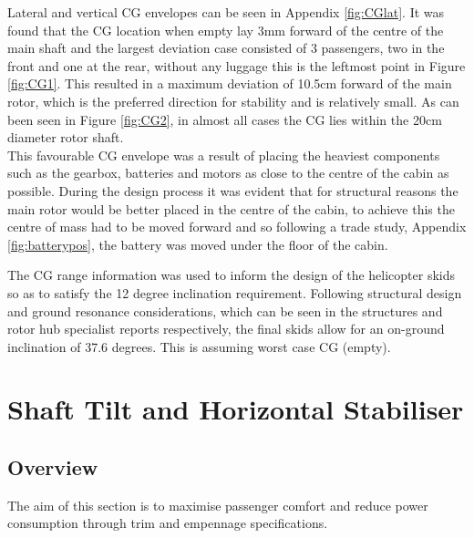 \documentclass[11pt,a4paper]{article}
\begin{document}
Lateral and vertical CG envelopes can be seen in Appendix \ref{fig:CGlat}.
It was found that the CG location when empty lay 3mm forward of the centre of the main shaft and the largest deviation case consisted of 3 passengers, two in the front and one at the rear, without any luggage this is the leftmost point in Figure \ref{fig:CG1}. This resulted in a maximum deviation of 10.5cm forward of the main rotor, which is the preferred direction for stability \cite{prouty} and is relatively small. As can been seen in Figure \ref{fig:CG2}, in almost all cases the CG lies within the 20cm diameter rotor shaft.\\ This favourable CG envelope was a result of placing the heaviest components such as the gearbox, batteries and motors as close to the centre of the cabin as possible. During the design process it was evident that for structural reasons the main rotor would be better placed in the centre of the cabin, to achieve this the centre of mass had to be moved forward and so following a trade study, Appendix \ref{fig:batterypos}, the battery was moved under the floor of the cabin.

The CG range information was used to inform the design of the helicopter skids so as to satisfy the 12 degree inclination requirement. Following structural design and ground resonance considerations, which can be seen in the structures and rotor hub specialist reports respectively, the final skids allow for an on-ground inclination of 37.6 degrees. This is assuming worst case CG (empty).\\

\section{Shaft Tilt and Horizontal Stabiliser}

\subsection{Overview}
The aim of this section is to maximise passenger comfort and reduce power consumption through trim and empennage specifications.
\end{document}
